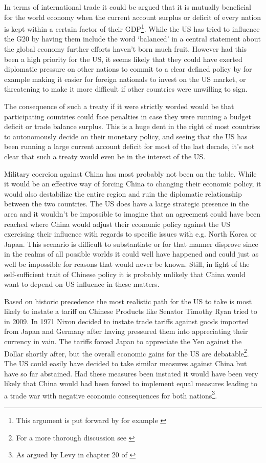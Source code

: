 In terms of international trade it could be argued that it is mutually 
beneficial for the world economy when the current account surplus or 
deficit of every nation is kept within a certain factor of their 
GDP\footnote{This argument is put forward by for example 
\cite{cline2009}}. While the US has tried to influence the G20 by having 
them include the word `balanced' in a central statement about the global 
economy further efforts haven't born much fruit. However had this been a 
high priority for the US, it seems likely that they could have exerted 
diplomatic pressure on other nations to commit to a clear defined policy 
by for example making it easier for foreign nationals to invest on the 
US market, or threatening to make it more difficult if other countries 
were unwilling to sign.

The consequence of such a treaty if it were strictly worded would be 
that participating countries could face penalties in case they were 
running a budget deficit or trade balance surplus.  This is a huge dent 
in the right of most countries to autonomously decide on their monetary 
policy, and seeing that the US has been running a large current account 
deficit for most of the last decade, it's not clear that such a treaty 
would even be in the interest of the US.

Military coercion against China has most probably not been on the table.  
While it would be an effective way of forcing China to changing their 
economic policy, it would also destabilize the entire region and ruin 
the diplomatic relationship between the two countries. The US does have 
a large strategic presence in the area and it wouldn't be impossible to 
imagine that an agreement could have been reached where China would 
adjust their economic policy against the US exercising their influence 
with regards to specific issues with e.g. North Korea or Japan. This 
scenario is difficult to substantiate or for that manner disprove since 
in the realms of all possible worlds it could well have happened and 
could just as well be impossible for reasons that would never be known.  
Still, in light of the self-sufficient trait of Chinese policy it is 
probably unlikely that China would want to depend on US influence in 
these matters.

Based on historic precedence the most realistic path for the US to take 
is most likely to instate a tariff on Chinese Products like Senator 
Timothy Ryan tried to in 2009. In 1971 Nixon decided to instate trade 
tariffs against goods imported from Japan and Germany after having 
pressured them into appreciating their currency in vain. The tariffs 
forced Japan to appreciate the Yen against the Dollar shortly after, but 
the overall economic gains for the US are debatable\footnote{For a more 
thorough discussion see \cite{kuroda2004}}. The US could easily have 
decided to take similar measures against China but have so far 
abstained. Had these measures been instated it would have been very 
likely that China would had been forced to implement equal measures 
leading to a trade war with negative economic consequences for both 
nations\footnote{As argued by Levy in chapter 20 of \cite{Evenett10}}.

